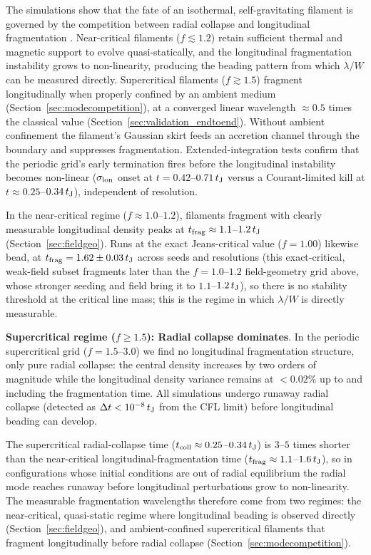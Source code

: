 \documentclass[usenatbib,twoside,twocolumn]{mnras}
\begin{document}
The simulations show that the fate of an isothermal, self-gravitating filament is governed by the competition between radial collapse and longitudinal fragmentation \citep{Inutsuka1997, Pon2012}. Near-critical filaments ($f\lesssim1.2$) retain sufficient thermal and magnetic support to evolve quasi-statically, and the longitudinal fragmentation instability grows to non-linearity, producing the beading pattern from which $\lambda/W$ can be measured directly. Supercritical filaments ($f\gtrsim1.5$) fragment longitudinally when properly confined by an ambient medium (Section~\ref{sec:modecompetition}), at a converged linear wavelength $\approx0.5$ times the classical value (Section~\ref{sec:validation_endtoend}). Without ambient confinement the filament's Gaussian skirt feeds an accretion channel through the boundary and suppresses fragmentation. Extended-integration tests confirm that the periodic grid's early termination fires before the longitudinal instability becomes non-linear ($\sigma_{\rm lon}$ onset at $t=0.42$--$0.71\,t_{\rm J}$ versus a Courant-limited kill at $t\approx0.25$--$0.34\,t_{\rm J}$), independent of resolution.

In the near-critical regime ($f\approx1.0$--$1.2$), filaments fragment with clearly measurable longitudinal density peaks at $t_{\rm frag}\approx1.1$--$1.2\,t_{\rm J}$ (Section~\ref{sec:fieldgeo}). Runs at the exact Jeans-critical value ($f=1.00$) likewise bead, at $t_{\rm frag}=1.62\pm0.03\,t_{\rm J}$ across seeds and resolutions (this exact-critical, weak-field subset fragments later than the $f=1.0$--$1.2$ field-geometry grid above, whose stronger seeding and field bring it to $1.1$--$1.2\,t_{\rm J}$), so there is no stability threshold at the critical line mass; this is the regime in which $\lambda/W$ is directly measurable.

\textbf{Supercritical regime ($f \geq 1.5$): Radial collapse dominates}. In the periodic supercritical grid ($f=1.5$--$3.0$) we find no longitudinal fragmentation structure, only pure radial collapse: the central density increases by two orders of magnitude while the longitudinal density variance remains at $<0.02\%$ up to and including the fragmentation time. All simulations undergo runaway radial collapse (detected as $\Delta t < 10^{-8}\,t_{\rm J}$ from the CFL limit) before longitudinal beading can develop.

The supercritical radial-collapse time ($t_{\rm coll}\approx0.25$--$0.34\,t_{\rm J}$) is $3$--$5$ times shorter than the near-critical longitudinal-fragmentation time ($t_{\rm frag}\approx1.1$--$1.6\,t_{\rm J}$), so in configurations whose initial conditions are out of radial equilibrium the radial mode reaches runaway before longitudinal perturbations grow to non-linearity. The measurable fragmentation wavelengths therefore come from two regimes: the near-critical, quasi-static regime where longitudinal beading is observed directly (Section~\ref{sec:fieldgeo}), and ambient-confined supercritical filaments that fragment longitudinally before radial collapse (Section~\ref{sec:modecompetition}).
\end{document}
